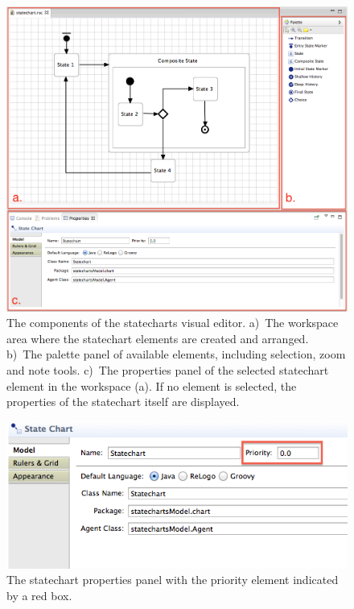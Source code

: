 \documentclass[11pt]{amsart}
\begin{document}
\begin{figure}
\begin{center}
\vspace{.2in}
\centerline {
\includegraphics[width=5in]{StatechartsImages/StatechartEditorBoxes.png}
}
\caption{The components of the statecharts visual editor. a)~The workspace area where the statechart elements are created and arranged. b)~The palette panel of available elements, including selection, zoom and note tools. c)~The properties panel of the selected statechart element in the workspace (a). If no element is selected, the properties of the statechart itself are displayed.}
\label{fig:statechartEditorBoxes}
\end{center}
\end{figure}

\begin{figure}
\begin{center}
\vspace{.2in}
\centerline {
\includegraphics[width=5in]{StatechartsImages/StatechartProperties.png}
}
\caption{The statechart properties panel with the priority element indicated by a red box.}
\label{fig:statechartProperties}
\end{center}
\end{figure}
\end{document}
